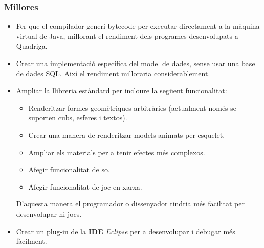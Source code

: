 \documentclass[serif,9pt]{beamer}
\begin{document}
  \begin{frame}\frametitle{Millores}
    \begin{itemize}
      \item Fer que el compilador generi bytecode per executar directament a la màquina virtual de Java, millorant el rendiment dels programes desenvolupats a Quadriga.
      \item Crear una implementació específica del model de dades, sense usar una base de dades SQL. Així el rendiment milloraria considerablement.
      \item Ampliar la llibreria estàndard per incloure la següent funcionalitat:
      \begin{itemize}
        \item Renderitzar formes geomètriques arbitràries (actualment només se suporten cubs, esferes i textos).
        \item Crear una manera de renderitzar models animats per esquelet.
        \item Ampliar els materials per a tenir efectes més complexos.
        \item Afegir funcionalitat de so.
        \item Afegir funcionalitat de joc en xarxa.
      \end{itemize}
      D'aquesta manera el programador o dissenyador tindria més facilitat per desenvolupar-hi jocs.
      \item Crear un plug-in de la {\bf IDE} {\em Eclipse} per a desenvolupar i debugar més fàcilment.
    \end{itemize}
  \end{frame}

\begin{frame}
\frametitle{}
\titlepage
\end{frame}
\end{document}

